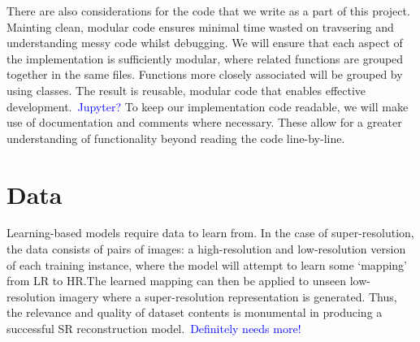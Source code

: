 There are also considerations for the code that we write as a part of this project. Mainting clean, modular code ensures minimal time wasted on travsering and understanding messy code whilst debugging. We will ensure that each aspect of the implementation is sufficiently modular, where related functions are grouped together in the same  files. Functions more closely associated will be grouped by using  classes. The result is reusable, modular code that enables effective development.\ \textcolor{blue}{Jupyter?} To keep our implementation code readable, we will make use of documentation and comments where necessary. These allow for a greater understanding of functionality beyond reading the code line-by-line.

\section{Data}
Learning-based models require data to learn from. In the case of super-resolution, the data consists of pairs of images: a high-resolution and low-resolution version of each training instance, where the model will attempt to learn some `mapping' from LR to HR.\@ The learned mapping can then be applied to unseen low-resolution imagery where a super-resolution representation is generated. Thus, the relevance and quality of dataset contents is monumental in producing a successful SR reconstruction model.\ \textcolor{blue}{Definitely needs more!}

